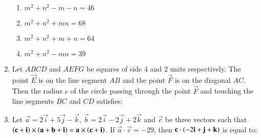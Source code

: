 \documentclass[journal,12pt,onecolumn]{IEEEtran}
\theoremstyle{remark}
\begin{document}
\begin{enumerate}
\hfill{}
\begin{enumerate}
\item $m^2+n^2-m-n=46$	
\item $m^2+n^2+mn=68$
\item $m^2+n^2+m+n=64$
\item $m^2+n^2-mn=39$
\end{enumerate}

\item Let $ABCD$ and $AEFG$ be squares of side $4$ and $2$ units respectively. The point $\vec{E}$ is on the line segment $AB$ and the point $\vec{F}$ is on the diagonal $AC$. Then the radius $r$ of the circle passing through the point $\vec{F}$ and touching the line segments $BC$ and $CD$ satisfies:
\begin{enumerate}
\end{enumerate}

\item Let $\vec{a}=2\vec{i}+5\vec{j}-\vec{k}$, $\vec{b}=2\vec{i}-2\vec{j}+2\vec{k}$ and $\vec{c}$ be three vectors such that $\left(\mathbf{c}+\mathbf{i}\right)\times\left(\mathbf{a}+\mathbf{b}+\mathbf{i}\right)=\mathbf{a}\times\left(\mathbf{c}+\mathbf{i}\right)$. If $\vec{a}\cdot\vec{c}=-29$, then $\mathbf{c}\cdot\left(-2\mathbf{i}+\mathbf{j}+\mathbf{k}\right)$ is equal to:

\hfill{}
\begin{enumerate}
\end{enumerate}
\end{enumerate}
\end{document}
